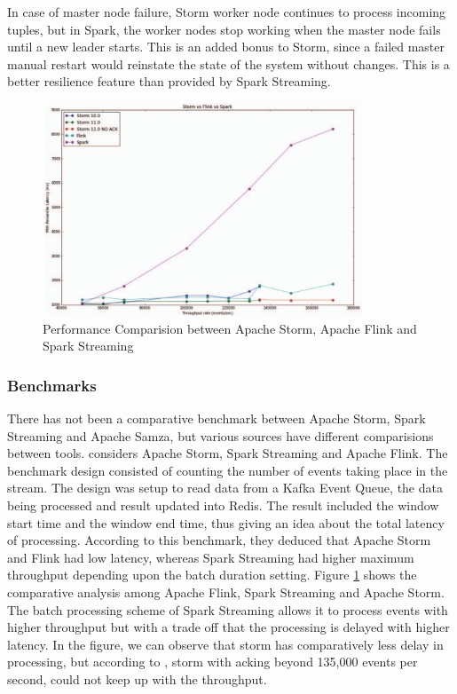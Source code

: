 \documentclass[runningheads,a4paper]{llncs}[2015/06/24]
\begin{document}
In case of master node failure, Storm worker node continues to process incoming tuples, but in Spark, the worker nodes stop working when the master node fails until a new leader starts. This is an added bonus to Storm, since a failed master manual restart would reinstate the state of the system without changes. This is a better resilience feature than provided by Spark Streaming.

\begin{figure}
\begin{center}
\includegraphics[width=0.85\textwidth]{comparisiongraph.png}
\caption{Performance Comparision between Apache Storm, Apache Flink and Spark Streaming \cite{benchmark}}
\label{fig:comparisiongraph}
\end{center}
\end{figure}
 
 \subsubsection{Benchmarks}
There has not been a comparative benchmark between Apache Storm, Spark Streaming and Apache Samza, but various sources have different comparisions between tools.  \cite{benchmark} considers Apache Storm, Spark Streaming and Apache Flink. The benchmark design consisted of counting the number of events taking place in the stream. The design was setup to read data from a Kafka Event Queue, the data being processed and result updated into Redis. The result included the window start time and the window end time, thus giving  an idea about the total latency of processing. According to this benchmark, they deduced that Apache Storm and Flink had low latency, whereas Spark Streaming had higher maximum throughput depending upon the batch duration setting. Figure \ref{fig:comparisiongraph} shows the comparative analysis among Apache Flink, Spark Streaming and Apache Storm. The batch processing scheme of Spark Streaming allows it to process events with higher throughput but with a trade off that the processing is delayed with higher latency. In the figure, we can observe that storm has comparatively less delay in processing, but according to \cite{benchmark}, storm with acking beyond 135,000 events per second, could not keep up with the throughput.
 
\end{document}
